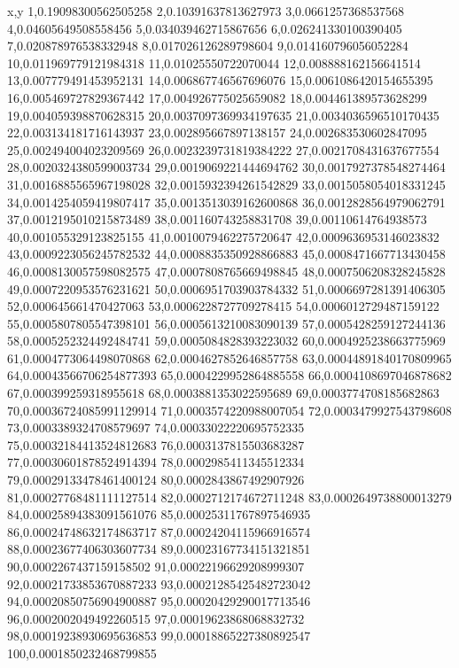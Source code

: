 x,y
1,0.19098300562505258
2,0.10391637813627973
3,0.0661257368537568
4,0.04605649508558456
5,0.034039462715867656
6,0.026241330100390405
7,0.020878976538332948
8,0.017026126289798604
9,0.014160796056052284
10,0.011969779121984318
11,0.01025550722070044
12,0.008888162156641514
13,0.007779491453952131
14,0.006867746567696076
15,0.0061086420154655395
16,0.005469727829367442
17,0.004926775025659082
18,0.004461389573628299
19,0.004059398870628315
20,0.0037097369934197635
21,0.0034036596510170435
22,0.003134181716143937
23,0.002895667897138157
24,0.002683530602847095
25,0.002494004023209569
26,0.0023239731819384222
27,0.0021708431637677554
28,0.0020324380599003734
29,0.0019069221444694762
30,0.0017927378548274464
31,0.0016885565967198028
32,0.0015932394261542829
33,0.0015058054018331245
34,0.0014254059419807417
35,0.0013513039162600868
36,0.0012828564979062791
37,0.0012195010215873489
38,0.001160743258831708
39,0.00110614764938573
40,0.001055329123825155
41,0.0010079462275720647
42,0.0009636953146023832
43,0.0009223056245782532
44,0.0008835350928866883
45,0.0008471667713430458
46,0.0008130057598082575
47,0.0007808765669498845
48,0.0007506208328245828
49,0.0007220953576231621
50,0.0006951703903784332
51,0.0006697281391406305
52,0.000645661470427063
53,0.0006228727709278415
54,0.0006012729487159122
55,0.0005807805547398101
56,0.0005613210083090139
57,0.0005428259127244136
58,0.0005252324492484741
59,0.0005084828393223032
60,0.0004925238663775969
61,0.0004773064498070868
62,0.0004627852646857758
63,0.00044891840170809965
64,0.00043566706254877393
65,0.0004229952864885558
66,0.0004108697046878682
67,0.000399259318955618
68,0.0003881353022595689
69,0.0003774708185682863
70,0.00036724085991129914
71,0.0003574220988007054
72,0.0003479927543798608
73,0.0003389324708579697
74,0.00033022220695752335
75,0.00032184413524812683
76,0.0003137815503683287
77,0.00030601878524914394
78,0.0002985411345512334
79,0.00029133478461400124
80,0.0002843867492907926
81,0.00027768481111127514
82,0.0002712174672711248
83,0.0002649738800013279
84,0.00025894383091561076
85,0.00025311767897546935
86,0.00024748632174863717
87,0.00024204115966916574
88,0.00023677406303607734
89,0.00023167734151321851
90,0.0002267437159158502
91,0.00022196629208999307
92,0.00021733853670887233
93,0.00021285425482723042
94,0.00020850756904900887
95,0.00020429290017713546
96,0.0002002049492260515
97,0.00019623868068832732
98,0.00019238930695636853
99,0.00018865227380892547
100,0.0001850232468799855
